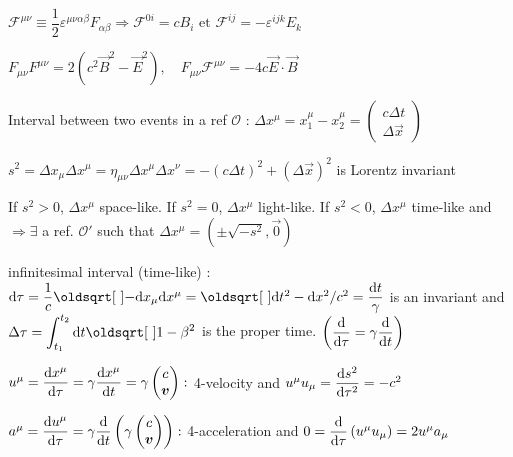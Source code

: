\item $\mathcal{F}^{\mu\nu} \equiv \dfrac{1}{2} \varepsilon^{\mu\nu\alpha\beta}F_{\alpha\beta} \Rightarrow \mathcal{F}^{0i} = cB_i \,\, \text{et} \,\, \mathcal{F}^{ij} = -\varepsilon^{ijk}E_k$

\item $F_{\mu\nu}F^{\mu\nu} = 2(c^2\vec{B}^2 - \vec{E}^2), \quad F_{\mu\nu}\mathcal{F}^{\mu\nu} = -4c\vec{E}\cdot\vec{B}$

\squishend
{}
\squishlist
\item Interval between two events in a ref $\mathcal{O}$ : $ \Delta x^{\mu} = x_1^{\mu} - x_2^{\mu} = \begin{pmatrix}
    c\Delta t \\
    \Delta \vec{x}
\end{pmatrix}$ 

\item $s^2 = \Delta x_\mu \Delta x^\mu = \eta_{\mu\nu} \Delta x^{\mu}\Delta x^{\nu} = -(c\Delta t)^2 + (\Delta \Vec{x})^2$ is Lorentz invariant

\item If $s^2>0$, $\Delta x^\mu$ space-like. If $s^2=0$, $\Delta x^\mu$ light-like. If $s^2<0$, $\Delta x^\mu$ time-like and $\Rightarrow \exists$ a ref. $\mathcal{O}'$ such that $\Delta x^{\mu} = \left( \pm \sqrt{-s^2} , \vec{0} \right)$\\

\item
infinitesimal interval (time-like) : $\ud \tau = \dfrac{1}{c}\sqrt{-\ud x_\mu\ud x^\mu} = \sqrt{\ud t^2 -\ud x^2/c^2} =\dfrac{\ud t}{\gamma} $
is an invariant and $\Delta\tau = {\displaystyle \int_{t_1}^{t_2}\ud t\sqrt{1-\beta^2} }$ is the proper time. $\left(\dfrac{\textrm{d} }{\textrm{d} \tau} = \gamma \dfrac{\textrm{d}}{\textrm{d} t}\right)$

\squishend
{}
\squishlist

\item $u^{\mu} = \dfrac{\textrm{d} x^{\mu}}{\textrm{d} \tau} = \gamma \dfrac{\textrm{d} x^{\mu}}{\textrm{d} t} = \gamma
\begin{pmatrix}
c \\
\mbox{\boldmath$v$}
\end{pmatrix} : $ 4-velocity and $u^{\mu}u_{\mu} = \dfrac{\textrm{d} s^2}{\textrm{d} \tau^2} = -c^2$

\item $a^{\mu} = \dfrac{\textrm{d} u^{\mu}}{\textrm{d} \tau}  = \gamma \dfrac{\textrm{d} }{\textrm{d}  t}\left(\gamma
\begin{pmatrix}
c \\
\mbox{\boldmath$v$}
\end{pmatrix}\right) : $ 4-acceleration and $ 0 = \dfrac{\textrm{d} }{\textrm{d} \tau}\left(u^{\mu}u_{\mu}\right) = 2u^{\mu}a_{\mu}$

